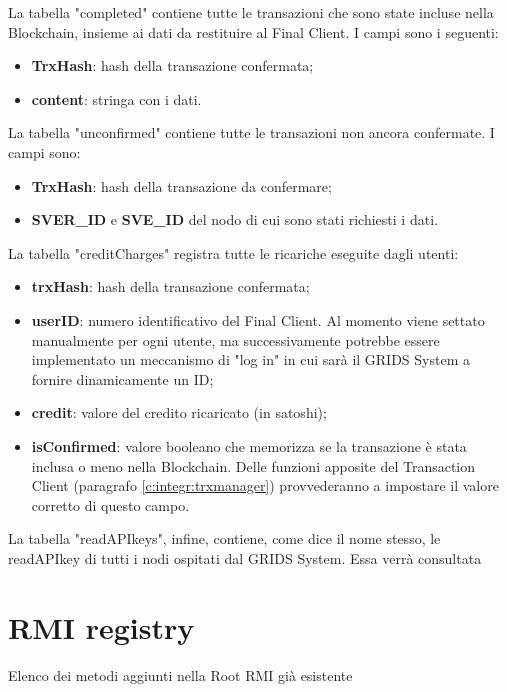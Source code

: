 La tabella "completed" contiene tutte le transazioni che sono state incluse nella Blockchain, insieme ai dati da restituire al Final Client. I campi sono i seguenti:

\begin{itemize}
    \item \textbf{TrxHash}: hash della transazione confermata;
	\item \textbf{content}: stringa con i dati.
\end{itemize}

La tabella "unconfirmed" contiene tutte le transazioni non ancora confermate. I campi sono:

\begin{itemize}
    \item \textbf{TrxHash}: hash della transazione da confermare;
    \item \textbf{SVER\_ID} e \textbf{SVE\_ID} del nodo di cui sono stati richiesti i dati.
\end{itemize}

La tabella "creditCharges" registra tutte le ricariche eseguite dagli utenti:

\begin{itemize}
    \item \textbf{trxHash}: hash della transazione confermata;
	\item \textbf{userID}: numero identificativo del Final Client. Al momento viene settato manualmente per ogni utente, ma successivamente potrebbe essere implementato un meccanismo di "log in" in cui sarà il GRIDS System a fornire dinamicamente un ID;
	\item \textbf{credit}: valore del credito ricaricato (in satoshi);
	\item \textbf{isConfirmed}: valore booleano che memorizza se la transazione è stata inclusa o meno nella Blockchain. Delle funzioni apposite del Transaction Client (paragrafo \ref{c:integr:trxmanager}) provvederanno a impostare il valore corretto di questo campo.
\end{itemize}

La tabella "readAPIkeys", infine, contiene, come dice il nome stesso, le readAPIkey di tutti i nodi ospitati dal GRIDS System. Essa verrà consultata 

\section{RMI registry}
\label{c:integr:rmi}

Elenco dei metodi aggiunti nella Root RMI già esistente

